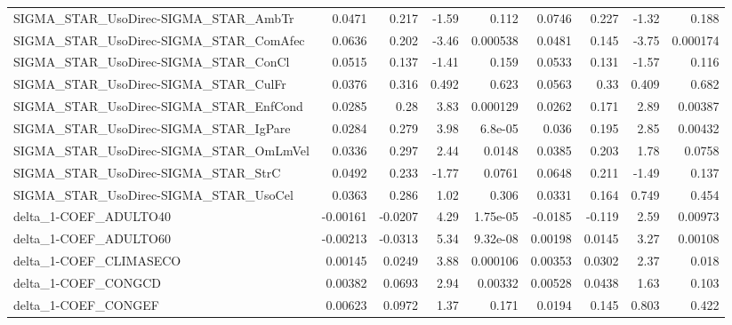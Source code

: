 \begin{tabular}{lrrrrrrrr}
SIGMA\_STAR\_UsoDirec-SIGMA\_STAR\_AmbTr   &      0.0471 &        0.217 &    -1.59 &    0.112 &     0.0746 &       0.227 &        -1.32 &         0.188 \\
SIGMA\_STAR\_UsoDirec-SIGMA\_STAR\_ComAfec &      0.0636 &        0.202 &    -3.46 & 0.000538 &     0.0481 &       0.145 &        -3.75 &      0.000174 \\
SIGMA\_STAR\_UsoDirec-SIGMA\_STAR\_ConCl   &      0.0515 &        0.137 &    -1.41 &    0.159 &     0.0533 &       0.131 &        -1.57 &         0.116 \\
SIGMA\_STAR\_UsoDirec-SIGMA\_STAR\_CulFr   &      0.0376 &        0.316 &    0.492 &    0.623 &     0.0563 &        0.33 &        0.409 &         0.682 \\
SIGMA\_STAR\_UsoDirec-SIGMA\_STAR\_EnfCond &      0.0285 &         0.28 &     3.83 & 0.000129 &     0.0262 &       0.171 &         2.89 &       0.00387 \\
SIGMA\_STAR\_UsoDirec-SIGMA\_STAR\_IgPare  &      0.0284 &        0.279 &     3.98 &  6.8e-05 &      0.036 &       0.195 &         2.85 &       0.00432 \\
SIGMA\_STAR\_UsoDirec-SIGMA\_STAR\_OmLmVel &      0.0336 &        0.297 &     2.44 &   0.0148 &     0.0385 &       0.203 &         1.78 &        0.0758 \\
SIGMA\_STAR\_UsoDirec-SIGMA\_STAR\_StrC    &      0.0492 &        0.233 &    -1.77 &   0.0761 &     0.0648 &       0.211 &        -1.49 &         0.137 \\
SIGMA\_STAR\_UsoDirec-SIGMA\_STAR\_UsoCel  &      0.0363 &        0.286 &     1.02 &    0.306 &     0.0331 &       0.164 &        0.749 &         0.454 \\
delta\_1-COEF\_ADULTO40                  &    -0.00161 &      -0.0207 &     4.29 & 1.75e-05 &    -0.0185 &      -0.119 &         2.59 &       0.00973 \\
delta\_1-COEF\_ADULTO60                  &    -0.00213 &      -0.0313 &     5.34 & 9.32e-08 &    0.00198 &      0.0145 &         3.27 &       0.00108 \\
delta\_1-COEF\_CLIMASECO                 &     0.00145 &       0.0249 &     3.88 & 0.000106 &    0.00353 &      0.0302 &         2.37 &         0.018 \\
delta\_1-COEF\_CONGCD                    &     0.00382 &       0.0693 &     2.94 &  0.00332 &    0.00528 &      0.0438 &         1.63 &         0.103 \\
delta\_1-COEF\_CONGEF                    &     0.00623 &       0.0972 &     1.37 &    0.171 &     0.0194 &       0.145 &        0.803 &         0.422 \\

\end{tabular}

